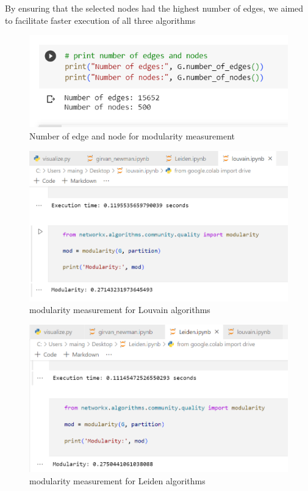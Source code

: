 By ensuring that the selected nodes had the highest number of edges, we aimed to facilitate faster execution of all three algorithms

\begin{figure}[H]
    \centering
    \includegraphics[width=\textwidth]{image/modulairytest.png}
    \caption{Number of edge and node for modularity measurement}
\end{figure}

\begin{figure}[H]
    \centering
    \includegraphics[width=\textwidth]{image/modularity measure louvain.png}
    \caption{modularity measurement for Louvain algorithms}
\end{figure}

\begin{figure}[H]
    \centering
    \includegraphics[width=\textwidth]{image/modularity measure leiden.png}
    \caption{modularity measurement for Leiden algorithms}
\end{figure}


